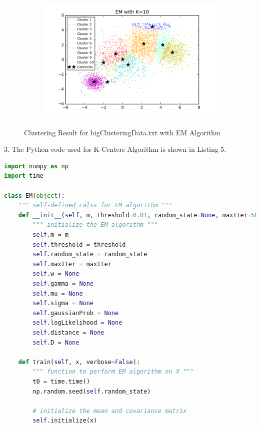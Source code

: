 \begin{description}
\begin{description}
\begin{figure}[!h]
\begin{subfigure}[b]{0.475\textwidth}
            \includegraphics[width=\textwidth]{./figures/bigClustering_EM_10.png}
        \end{subfigure}
        
        \caption{Clustering Result for bigClusteringData.txt with EM Algorithm}
        \label{fig:EM_bigClustering}
\end{figure}

\newpage
\item{3.} The Python code used for K-Centers Algorithm is shown in Listing 5.

\begin{lstlisting}[language=Python, caption=EM Algorithm Python Code]
import numpy as np
import time

class EM(object):
    """ self-defined calss for EM algorithm """
    def __init__(self, m, threshold=0.01, random_state=None, maxIter=500):
        """ initialize the EM algorithm """
        self.m = m
        self.threshold = threshold
        self.random_state = random_state
        self.maxIter = maxIter
        self.w = None
        self.gamma = None
        self.mu = None
        self.sigma = None
        self.gaussianProb = None
        self.logLikelihood = None
        self.distance = None
        self.D = None

    def train(self, x, verbose=False):
        """ function to perform EM algorithm on X """
        t0 = time.time()
        np.random.seed(self.random_state)

        # initialize the mean and covariance matrix
        self.initialize(x)


\end{lstlisting}
\end{description}
\end{description}
